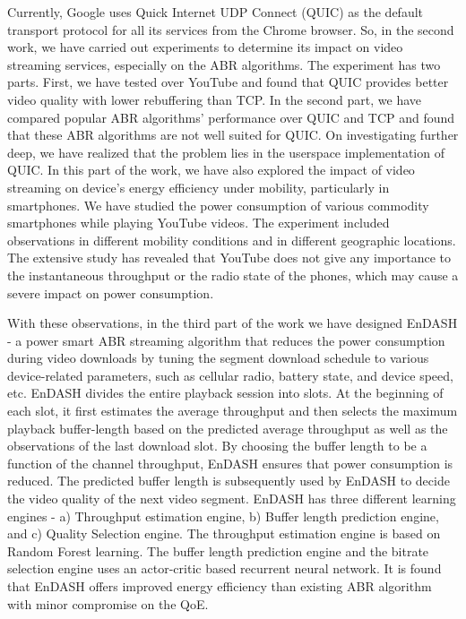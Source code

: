 {Currently, Google uses Quick Internet UDP Connect (QUIC) as the default transport protocol for all its services from the Chrome browser. So, in the second work, we have carried out experiments to determine its impact on video streaming services, especially on the ABR algorithms. The experiment has two parts. First, we have tested over YouTube and found that QUIC provides better video quality with lower rebuffering than TCP. In the second part, we have compared popular ABR algorithms' performance over QUIC and TCP and found that these ABR algorithms are not well suited for QUIC. On investigating further deep, we have realized that the problem lies in the userspace implementation of QUIC. In this part of the work, we have also explored the impact of video streaming on device's energy efficiency  under mobility, particularly in smartphones. We have studied the power consumption of various commodity smartphones while playing YouTube videos. The experiment included observations in different mobility conditions and in different geographic locations. The extensive study has revealed that YouTube does not give any importance to the instantaneous throughput or the radio state of the phones, which may cause a severe impact on power consumption.

With these observations, in the third part of the work we have designed EnDASH - a power smart ABR streaming algorithm that reduces the power consumption during video downloads by tuning the segment download schedule to various device-related parameters, such as cellular radio, battery state, and device speed, etc. EnDASH divides the entire playback session into slots. At the beginning of each slot, it first estimates the average throughput and then selects the maximum playback buffer-length based on the predicted average throughput as well as the observations of the last download slot. By choosing the buffer length to be a function of the channel throughput, EnDASH ensures that power consumption is reduced. The predicted buffer length is subsequently used by EnDASH to decide the video quality of the next video segment. EnDASH has three different learning engines - a) Throughput estimation engine, b) Buffer length prediction engine, and c) Quality Selection engine. The throughput estimation engine is based on Random Forest learning. The buffer length prediction engine and the bitrate selection engine uses an actor-critic based recurrent neural network. It is found that EnDASH offers improved energy efficiency than existing ABR algorithm with minor compromise on the QoE.

}
